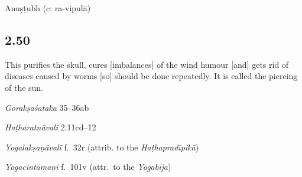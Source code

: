 \begin{ekdosis}
\begin{metre}[hp02_049]
Anuṣṭubh (c: ra-vipulā)
\end{metre}

\subsection*{2.50}
\begin{translation}[hp02_050]
This purifies the skull, cures [imbalances] of the wind humour [and] gets rid of diseases caused by worms [so] should be done repeatedly. It is called the piercing of the sun.
\end{translation}

\begin{sources}[hp02_050]
\emph{Gorakṣaśataka} 35–36ab

\begin{versinnote}
\end{versinnote}
\end{sources}

\begin{testimonia}[hp02_050]
\emph{Haṭharatnāvalī} 2.11cd–12

\begin{versinnote}
\tl{\var{kapālaṃ ... śanaiḥ ] kapālaśodhanaṃ vātadoṣaghnaṃ kṛmināśanaṃ N,n1,n4.}\\+}
\end{versinnote} 

\emph{Yogalakṣaṇāvalī} f.~32r (attrib. to the \emph{Haṭhapradīpikā})
\begin{versinnote}
\end{versinnote}

\emph{Yogacintāmaṇi} f.~101v (attr.~to the \emph{Yogabīja})
\begin{versinnote} 
\end{versinnote} 


\end{testimonia}
\end{ekdosis}
